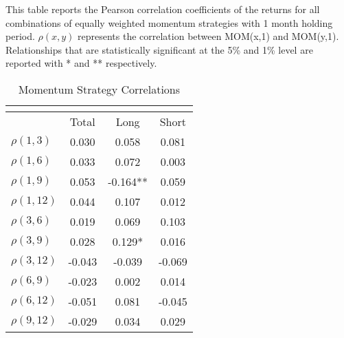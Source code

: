 \documentclass{article}
\begin{document}
\begin{table}[t!]
  \centering
  \caption{Momentum Strategy Correlations}
  This table reports the Pearson correlation coefficients of the returns for all combinations of equally weighted momentum strategies with 1 month holding period. $\rho(x,y)$ represents the correlation between MOM(x,1) and MOM(y,1). Relationships that are statistically significant at the 5\% and 1\% level are reported with * and ** respectively.
    \begin{tabular}{lccc}
    \multicolumn{1}{c}{} &       &       &  \\
    \toprule
    \multicolumn{1}{r}{} & Total & Long  & Short \\
    \midrule
    $\rho(1,3)$ & 0.030 & 0.058 & 0.081 \\
    $\rho(1,6)$ & 0.033 & 0.072 & 0.003 \\
    $\rho(1,9)$ & 0.053 & -0.164** & 0.059 \\
    $\rho(1,12)$ & 0.044 & 0.107 & 0.012 \\
    $\rho(3,6)$ & 0.019 & 0.069 & 0.103 \\
    $\rho(3,9)$ & 0.028 & 0.129* & 0.016 \\
    $\rho(3,12)$ & -0.043 & -0.039 & -0.069 \\
    $\rho(6,9)$ & -0.023 & 0.002 & 0.014 \\
    $\rho(6,12)$ & -0.051 & 0.081 & -0.045 \\
    $\rho(9,12)$ & -0.029 & 0.034 & 0.029 \\
    \bottomrule
    \end{tabular}%
  \label{COR}%
\end{table}%
\end{document}
